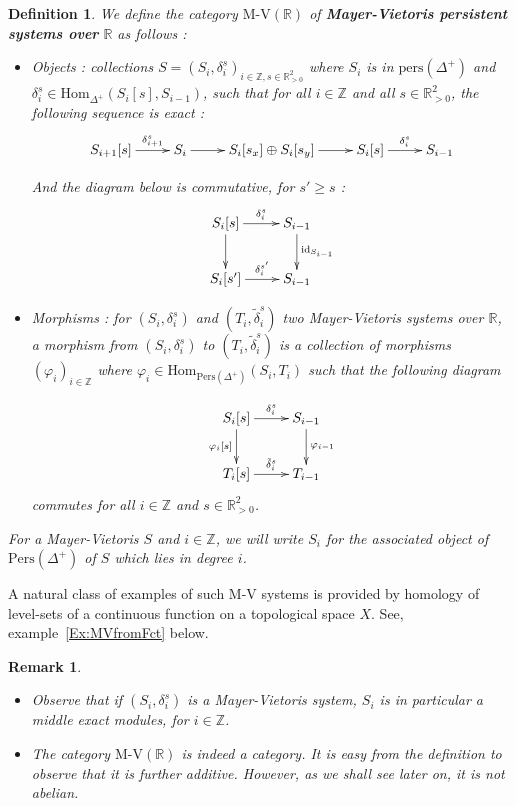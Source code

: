 \documentclass[a4paper, english, 11pt]{article}
\newcommand{\0}{\vec{0}}
\newcommand{\R}[0]{\mathbb{R}}
\newcommand{\Z}[0]{\mathbb{Z}}
\newcommand{\Hom}[0]{\text{Hom}}
\newcommand{\Pers}[0]{\text{Pers}}
\newtheorem{remark}[prop]{Remark}
\newtheorem{defi}[prop]{Definition}
\begin{document}
\begin{defi}\label{D:MVSystem}
We define the category $\text{M-V}(\R)$ of \textbf{Mayer-Vietoris persistent systems over} $\R$ as follows : 

\begin{itemize}
    \item[$\bullet$] Objects : collections $S=(S_i,\delta_i^s)_{i\in \Z,s\in \R_{>0}^2}$ where $S_i$ is in $\text{pers}(\Delta^+)$ and $\delta_i^s\in \Hom_{\Delta^+}(S_i[s], S_{i-1})$, such that for all $i\in \Z$ and all $s\in \R_{>0}^2$, the following sequence is exact : 
    \begin{equation}\xymatrix{S_{i+1}[s] \ar[r]^-{\delta_{i+1}^s} & S_i \ar[r] & S_i[s_x] \oplus S_i[s_y] \ar[r] & S_i[s] \ar[r]^-{\delta_{i}^s} & S_{i-1}}\label{eq:MVSystemles}\end{equation}
    
    And the diagram below is commutative, for $s'\geq s$ :  \begin{equation}\label{D:ComSaquareforMV}\xymatrix{  S_i[s] \ar[r]^-{\delta_{i}^{s}} \ar[d] & S_{i-1} \ar[d]^{\text{id}_{S_{i-1}}} \\
    S_i[s'] \ar[r]^-{{\delta}_{i}^{s'}} & S_{i-1}}\end{equation}
    
    \item[$\bullet$] Morphisms : for $(S_i,\delta_i^s)$ and $(T_i,\tilde{\delta}_i^s)$ two Mayer-Vietoris systems over $\R$, a morphism from $(S_i,\delta_i^s)$ to $(T_i,\tilde{\delta}_i^s)$ is a collection of morphisms $(\varphi_i)_{i\in \Z}$ where $\varphi_i \in \Hom_{\Pers(\Delta^+)}(S_i,T_i)$ such that the following diagram
    
   \begin{equation}\xymatrix{  S_i[s] \ar[r]^-{\delta_{i}^s} \ar[d]_{\varphi_i[s]} & S_{i-1} \ar[d]^{\varphi_{i-1}} \\
    T_i[s] \ar[r]^-{\tilde{\delta}_{i}^s} & T_{i-1}}\end{equation} commutes for all $i\in \Z$ and $s\in \R_{>0}^2$. 
\end{itemize}
For a Mayer-Vietoris $S$ and $i\in \Z$, we will write $S_i$ for the associated object of $\Pers(\Delta^+)$ of $S$ which lies in degree $i$.
\end{defi}
A natural class of examples of such M-V systems is provided by homology of level-sets of a  continuous function on a topological space $X$. See, example~\ref{Ex:MVfromFct} below.
\begin{remark}
\begin{itemize}
    \item Observe that if $(S_i,\delta_i^s)$ is a Mayer-Vietoris system, $S_i$ is in particular a middle exact modules, for $i\in \Z$. 
    \item The category $\text{M-V}(\R)$ is indeed a category. It is easy from the definition to observe that it is further additive. However, as we shall see later on, it is not abelian. 
\end{itemize}
\end{remark}
\end{document}
